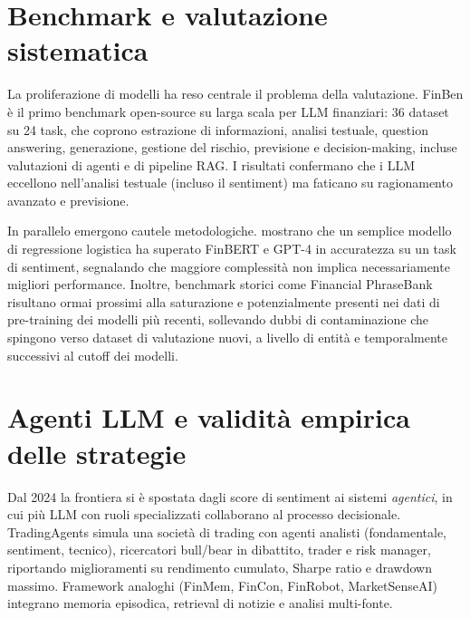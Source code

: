 \section{Benchmark e valutazione sistematica}

La proliferazione di modelli ha reso centrale il problema della valutazione.
FinBen \parencite{xie2024finben} è il primo benchmark open-source su larga scala per LLM finanziari: 36 dataset su 24 task, che coprono estrazione di informazioni, analisi testuale, question answering, generazione, gestione del rischio, previsione e decision-making, incluse valutazioni di agenti e di pipeline RAG.
I risultati confermano che i LLM eccellono nell'analisi testuale (incluso il sentiment) ma faticano su ragionamento avanzato e previsione.

In parallelo emergono cautele metodologiche.
\textcite{bdcc8110143} mostrano che un semplice modello di regressione logistica ha superato FinBERT e GPT-4 in accuratezza su un task di sentiment, segnalando che maggiore complessità non implica necessariamente migliori performance.
Inoltre, benchmark storici come Financial PhraseBank risultano ormai prossimi alla saturazione e potenzialmente presenti nei dati di pre-training dei modelli più recenti, sollevando dubbi di contaminazione che spingono verso dataset di valutazione nuovi, a livello di entità \parencite{tang-etal-2023-finentity} e temporalmente successivi al cutoff dei modelli.

\section{Agenti LLM e validità empirica delle strategie}

Dal 2024 la frontiera si è spostata dagli score di sentiment ai sistemi \textit{agentici}, in cui più LLM con ruoli specializzati collaborano al processo decisionale.
TradingAgents \parencite{xiao2025tradingagents} simula una società di trading con agenti analisti (fondamentale, sentiment, tecnico), ricercatori bull/bear in dibattito, trader e risk manager, riportando miglioramenti su rendimento cumulato, Sharpe ratio e drawdown massimo.
Framework analoghi (FinMem, FinCon, FinRobot, MarketSenseAI) integrano memoria episodica, retrieval di notizie e analisi multi-fonte.

